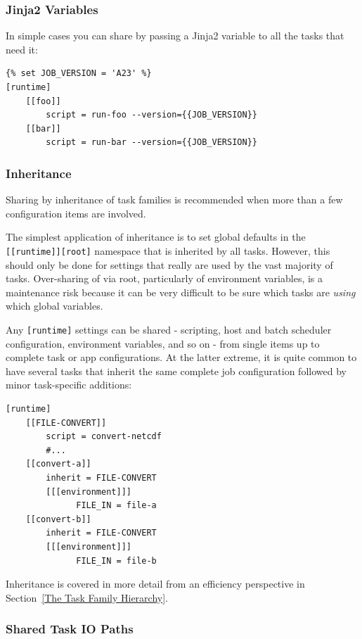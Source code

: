 \subsubsection{Jinja2 Variables}

In simple cases you can share by passing a Jinja2 variable to all the tasks
that need it:

\lstset{language=suiterc}
\begin{lstlisting}
{% set JOB_VERSION = 'A23' %}
[runtime]
    [[foo]]
        script = run-foo --version={{JOB_VERSION}}
    [[bar]]
        script = run-bar --version={{JOB_VERSION}}
\end{lstlisting}

\subsubsection{Inheritance}

Sharing by inheritance of task families is recommended when more than a few
configuration items are involved.

The simplest application of inheritance is to set global defaults in the
\lstinline=[[runtime]][root]= namespace that is inherited by all tasks.
However, this should only be done for settings that really are used
by the vast majority of tasks. Over-sharing of via root, particularly of
environment variables, is a maintenance risk because it can be very
difficult to be sure which tasks are {\em using} which global variables.

Any \lstinline=[runtime]= settings can be shared - scripting, host
and batch scheduler configuration, environment variables, and so on - from
single items up to complete task or app configurations.  At the latter extreme,
it is quite common to have several tasks that inherit the same complete
job configuration followed by minor task-specific additions:

\lstset{language=suiterc}
\begin{lstlisting}
[runtime]
    [[FILE-CONVERT]]
        script = convert-netcdf
        #...
    [[convert-a]]
        inherit = FILE-CONVERT
        [[[environment]]]
              FILE_IN = file-a
    [[convert-b]]
        inherit = FILE-CONVERT
        [[[environment]]]
              FILE_IN = file-b
\end{lstlisting}

Inheritance is covered in more detail from an efficiency perspective in
Section~\ref{The Task Family Hierarchy}.

\subsubsection{Shared Task IO Paths}
\label{Shared Task IO Paths}

